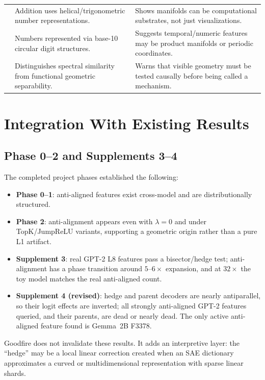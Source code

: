 \documentclass[11pt,a4paper]{article}
\begin{document}
\begin{longtable}{@{}p{3.2cm}p{5.2cm}p{6.2cm}@{}}
\citet{kantamneni2025trigonometry} & Addition uses helical/trigonometric number representations. & Shows manifolds can be computational substrates, not just visualizations.\\
\citet{levy2024digits} & Numbers represented via base-10 circular digit structures. & Suggests temporal/numeric features may be product manifolds or periodic coordinates.\\
\citet{fu2026convergent} & Distinguishes spectral similarity from functional geometric separability. & Warns that visible geometry must be tested causally before being called a mechanism.\\
\bottomrule
\end{longtable}

\section{Integration With Existing Results}
\label{sec:integration}

\subsection{Phase 0--2 and Supplements 3--4}

The completed project phases established the following:
\begin{itemize}[noitemsep]
  \item \textbf{Phase 0--1}: anti-aligned features exist cross-model and are distributionally structured.
  \item \textbf{Phase 2}: anti-alignment appears even with $\lambda=0$ and under TopK/JumpReLU variants, supporting a geometric origin rather than a pure L1 artifact.
  \item \textbf{Supplement 3}: real GPT-2 L8 features pass a bisector/hedge test; anti-alignment has a phase transition around $5$--$6\times$ expansion, and at $32\times$ the toy model matches the real anti-aligned count.
  \item \textbf{Supplement 4 (revised)}: hedge and parent decoders are nearly antiparallel, so their logit effects are inverted; all strongly anti-aligned GPT-2 features queried, and their parents, are dead or nearly dead. The only active anti-aligned feature found is Gemma~2B F3378.
\end{itemize}

Goodfire does not invalidate these results. It adds an interpretive layer: the ``hedge'' may be a local linear correction created when an SAE dictionary approximates a curved or multidimensional representation with sparse linear shards.
\end{document}
